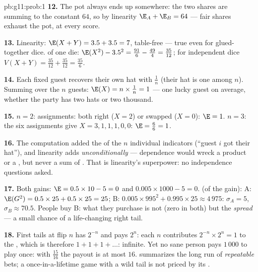 \begin{solution}{pb:g11:prob:1}
\textbf{12.} The pot always ends up somewhere: the two shares
are  summing to the constant $64$, so by
linearity $\E_A + \E_B = 64$ --- fair shares exhaust the pot,
at every score.

\textbf{13.} Linearity: $\E(X + Y) = 3.5 + 3.5 = 7$, table-free
--- true even for glued-together dice.  of one die:
$\E(X^2) - 3.5^2 = \frac{91}{6} - \frac{49}{4} = \frac{35}{12}$;
for independent dice
$V(X + Y) = \frac{35}{12} + \frac{35}{12} = \frac{35}{6}$.

\textbf{14.} Each fixed guest recovers their own hat with
 $\frac1n$ (their hat is one among $n$). Summing
over the $n$ guests:
$\E(X) = n \times \frac1n = 1$ --- one lucky guest on average,
whether the party has two hats or two thousand.

\textbf{15.} $n = 2$: assignments: both right ($X = 2$) or
swapped ($X = 0$): $\E = 1$. $n = 3$: the six assignments give
$X = 3, 1, 1, 1, 0, 0$: $\E = \frac{6}{6} = 1$.

\textbf{16.} The computation added the  of the $n$
individual indicators (``guest $i$ got their hat''), and
linearity adds  \emph{unconditionally} ---
dependence would wreck a product or a , but never a
sum of . That is linearity's superpower: no
independence questions asked.

\textbf{17.} Both gains: $\E = 0.5 \times 10 - 5 = 0$ and
$0.005 \times 1000 - 5 = 0$.  (of the gain):
A: $\E(G^2) = 0.5 \times 25 + 0.5 \times 25 = 25$;
B: $0.005 \times 995^2 + 0.995 \times 25 \approx 4\,975$:
$\sigma_A = 5$, $\sigma_B \approx 70.5$. People buy B: what
they purchase is not  (zero in both) but the
\emph{spread} --- a small chance of a life-changing right
tail.

\textbf{18.} First tails at flip $n$ has 
$2^{-n}$ and pays $2^n$: each $n$ contributes
$2^{-n} \times 2^n = 1$ to the , which is therefore
$1 + 1 + 1 + \dots$: infinite. Yet no sane person pays
$1\,000$ to play once: with  $\frac{15}{16}$ the
payout is at most $16$.  summarizes the long run of
\emph{repeatable} bets; a once-in-a-lifetime game with a wild
tail is not priced by its .


\end{solution}
